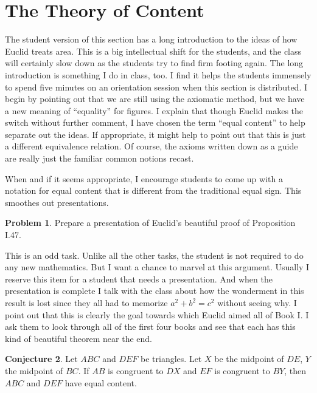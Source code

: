 \documentclass{tufte-handout}
\theoremstyle{definition}
\newtheorem{problem}{Problem}[section]
\newtheorem{conjecture}[problem]{Conjecture}
\begin{document}
\clearpage
\setcounter{section}{13}
\setcounter{problem}{0}
\section{The Theory of Content}

The student version of this section has a long introduction to the ideas of how Euclid treats area. This is a big intellectual shift for the students, and the class will certainly slow down as the students try to find firm footing again. The long introduction is something I do in class, too. I find it helps the students immensely to spend five minutes on an orientation session when this section is distributed. I begin by pointing out that we are still using the axiomatic method, but we have a new meaning of ``equality'' for figures. I explain that though Euclid makes the switch without further comment, I have chosen the term ``equal content'' to help separate out the ideas. If appropriate, it might help to point out that this is just a different equivalence relation. Of course, the axioms written down as a guide are really just the familiar common notions recast.

When and if it seems appropriate, I encourage students to come up with a notation for equal content that is different from the traditional equal sign. This smoothes out presentations.


\begin{problem}\label{prob:present-pythagoras} 
Prepare a presentation of Euclid's beautiful proof of Proposition I.47.
\end{problem}

This is an odd task. Unlike all the other tasks, the student is not required to do any new mathematics. But I want a chance to marvel at this argument. Usually I reserve this item for a student that needs a presentation. And when the presentation is complete I talk with the class about how the wonderment in this result is lost since they all had to memorize $a^2 + b^2 = c^2$ without seeing why. I point out that this is clearly the goal towards which Euclid aimed all of Book I. I ask them to look through all of the first four books and see that each has this kind of beautiful theorem near the end.

\begin{conjecture}\label{conj:false-area}
Let $ABC$ and $DEF$ be triangles. Let $X$ be the midpoint of $DE$, $Y$ the midpoint of $BC$. If $AB$ is congruent to $DX$ and $EF$ is congruent to $BY$, then $ABC$ and $DEF$ have equal content.
\end{conjecture}
\end{document}
